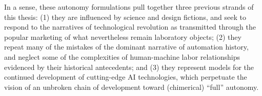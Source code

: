 







In a sense, these autonomy
formulations pull together three previous strands of this
thesis: (1) they are influenced by science and design fictions, and seek
to respond to the narratives of technological revolution as
transmitted through the popular marketing of what nevertheless remain laboratory
objects; (2) they repeat many of the mistakes of the dominant narrative of
automation history, and neglect some of the complexities of
human-machine labor relationships evidenced by their historical
antecedents; and (3) they represent models for the
continued development of cutting-edge AI technologies, which perpetuate
the vision of an unbroken chain of development toward
(chimerical) ``full'' autonomy. 


